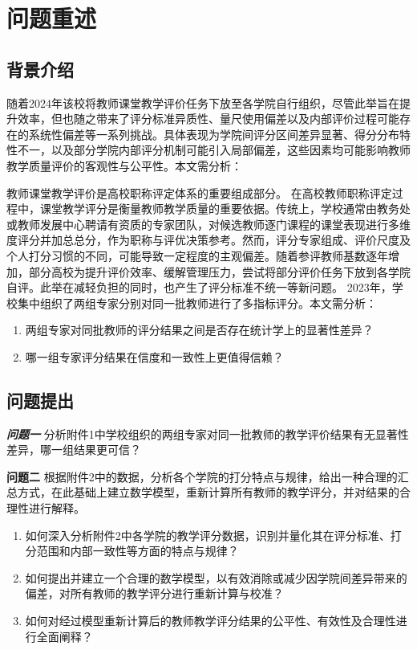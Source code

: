 
\section{问题重述}



\subsection{背景介绍}

随着2024年该校将教师课堂教学评价任务下放至各学院自行组织，尽管此举旨在提升效率，但也随之带来了评分标准异质性、量尺使用偏差以及内部评价过程可能存在的系统性偏差等一系列挑战。具体表现为学院间评分区间差异显著、得分分布特性不一，以及部分学院内部评分机制可能引入局部偏差，这些因素均可能影响教师教学质量评价的客观性与公平性。本文需分析：

教师课堂教学评价是高校职称评定体系的重要组成部分。
在高校教师职称评定过程中，课堂教学评分是衡量教师教学质量的重要依据。传统上，学校通常由教务处或教师发展中心聘请有资质的专家团队，对候选教师逐门课程的课堂表现进行多维度评分并加总总分，作为职称与评优决策参考。然而，评分专家组成、评价尺度及个人打分习惯的不同，可能导致一定程度的主观偏差。随着参评教师基数逐年增加，部分高校为提升评价效率、缓解管理压力，尝试将部分评价任务下放到各学院自评。此举在减轻负担的同时，也产生了评分标准不统一等新问题。
2023年，学校集中组织了两组专家分别对同一批教师进行了多指标评分。本文需分析：
\begin{enumerate}
    \item 两组专家对同批教师的评分结果之间是否存在统计学上的显著性差异？
    \item 哪一组专家评分结果在信度和一致性上更值得信赖？
\end{enumerate}


\subsection{问题提出}
\textbf\textit{{问题一}}
分析附件1中学校组织的两组专家对同一批教师的教学评价结果有无显著性差异，哪一组结果更可信？

\textbf{问题二} 
根据附件2中的数据，分析各个学院的打分特点与规律，给出一种合理的汇总方式，在此基础上建立数学模型，重新计算所有教师的教学评分，并对结果的合理性进行解释。

\begin{enumerate}
    \item 如何深入分析附件2中各学院的教学评分数据，识别并量化其在评分标准、打分范围和内部一致性等方面的特点与规律？
    \item 如何提出并建立一个合理的数学模型，以有效消除或减少因学院间差异带来的偏差，对所有教师的教学评分进行重新计算与校准？
    \item 如何对经过模型重新计算后的教师教学评分结果的公平性、有效性及合理性进行全面阐释？
\end{enumerate}






